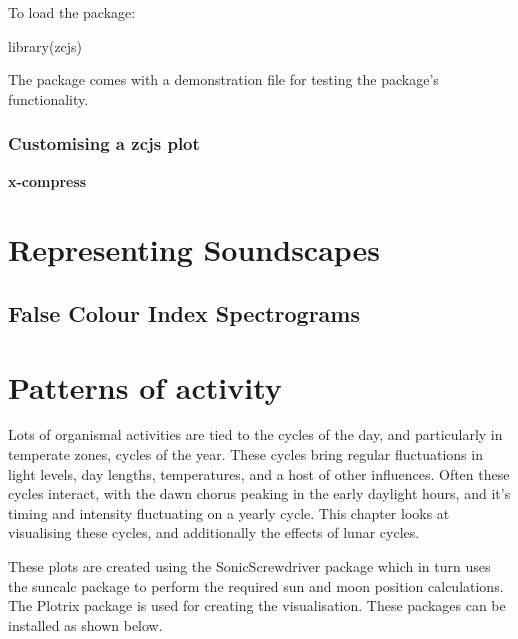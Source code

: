 \documentclass[
]{book}
\newenvironment{Shaded}{\begin{snugshade}}{\end{snugshade}}
\newcommand{\FunctionTok}[1]{\textcolor[rgb]{0.00,0.00,0.00}{#1}}
\newcommand{\NormalTok}[1]{#1}
\begin{document}
To load the package:

\begin{Shaded}
\begin{Highlighting}[]
\FunctionTok{library}\NormalTok{(zcjs)}
\end{Highlighting}
\end{Shaded}

The package comes with a demonstration file for testing the package's functionality.

\hypertarget{customising-a-zcjs-plot}{%
\subsection{Customising a zcjs plot}\label{customising-a-zcjs-plot}}

\textbf{x-compress}

\hypertarget{representing-soundscapes}{%
\chapter{Representing Soundscapes}\label{representing-soundscapes}}

\hypertarget{false-colour-index-spectrograms}{%
\section{False Colour Index Spectrograms}\label{false-colour-index-spectrograms}}

\hypertarget{patterns-of-activity}{%
\chapter{Patterns of activity}\label{patterns-of-activity}}

Lots of organismal activities are tied to the cycles of the day, and particularly in temperate zones, cycles of the year. These cycles bring regular fluctuations in light levels, day lengths, temperatures, and a host of other influences. Often these cycles interact, with the dawn chorus peaking in the early daylight hours, and it's timing and intensity fluctuating on a yearly cycle. This chapter looks at visualising these cycles, and additionally the effects of lunar cycles.

These plots are created using the SonicScrewdriver package \citep{sonicscrewdriver} which in turn uses the suncalc package \citep{suncalc} to perform the required sun and moon position calculations. The Plotrix package \citep{plotrix} is used for creating the visualisation. These packages can be installed as shown below.
\end{document}

